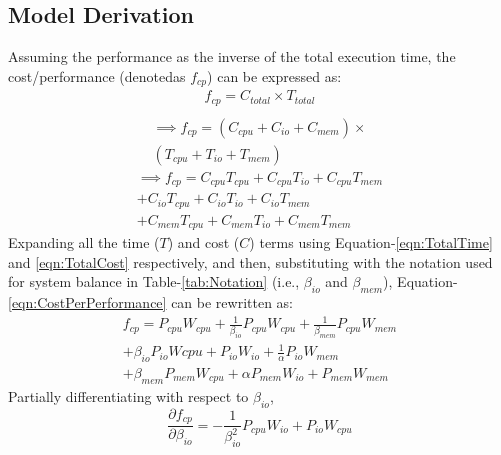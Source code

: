 \documentclass[journal]{IEEEtran}
\begin{document}
\subsection{Model Derivation}
Assuming the performance as the inverse of the total execution time, the cost/performance (denotedas $f_{cp}$) can be expressed as:
\begin{equation} %
\begin{split}
f_{cp} = C_{total} \times T_{total} \\
\end{split}
\end{equation}
\begin{equation} %
\begin{split}
\implies f _{cp}= (C_{cpu} + C_{io} + C_{mem}) \times\\ 
(T_{cpu} + T_{io} + T_{mem}) 
\end{split}
\end{equation}
\begin{equation} \label{eqn:CostPerPerformance}
\begin{split}
\implies f_{cp} = C_{cpu}T_{cpu} + C_{cpu}T_{io} + C_{cpu}T_{mem} \\
   + C_{io}T_{cpu} + C_{io}T_{io} + C_{io}T_{mem} \\
   + C_{mem}T_{cpu} + C_{mem}T_{io} + C_{mem}T_{mem} 
\end{split}
\end{equation}
Expanding all the time ($T$) and cost ($C$) terms using Equation-\ref{eqn:TotalTime} and \ref{eqn:TotalCost} respectively, and then, substituting with the notation used for system balance in Table-\ref{tab:Notation} (i.e., $\beta_{io}$ and $\beta_{mem}$),  Equation-\ref{eqn:CostPerPerformance} can be rewritten as:
\begin{equation}\label{eqn:CostPerPerformanceBalance}
\begin{split}
f_{cp} = P_{cpu}W_{cpu} + \frac{1}{\beta_{io}}P_{cpu}W_{cpu} + \frac{1}{\beta_{mem}}P_{cpu}W_{mem} \\
+ \beta_{io}P_{io}W{cpu} + P_{io}W_{io} + \frac{1}{\alpha}P_{io}W_{mem}\\
+ \beta_{mem}P_{mem}W_{cpu} + \alpha P_{mem}W_{io} + P_{mem}W_{mem}
\end{split}
\end{equation}
Partially differentiating with respect to $\beta_{io}$,
\begin{equation} \label{eqn:DiffWithBetaIo}
\frac{\partial f_{cp}}{\partial \beta_{io}} = -\frac{1}{\beta_{io}^2}P_{cpu}W_{io} + P_{io}W_{cpu}
\end{equation}
\end{document}

